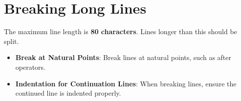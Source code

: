 \section{Breaking Long Lines}
The maximum line length is \textbf{80 characters}. Lines longer than this should be split.
\begin{itemize}
    \item \textbf{Break at Natural Points}: Break lines at natural points, such as after operators.
    \item \textbf{Indentation for Continuation Lines}: When breaking lines, ensure the continued line is indented properly.
\end{itemize}

